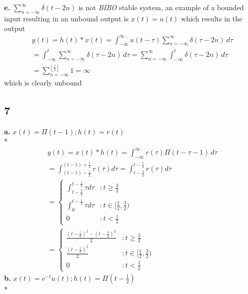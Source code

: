 \documentclass[10pt, letterpaper]{article}
\begin{document}
\textbf{e.} $\sum_{n = -\infty}^{\infty}\delta(t - 2n)$ is not \emph{BIBO} stable system, an example of a bounded input 
resulting in an unbound output is $x(t)= u(t)$ which results in the output
\begin{align*}
	y(t) = h(t) * x(t) = 
	\int_{-\infty}^{\infty} u(t - \tau)\sum_{n = -\infty}^{\infty} \delta(\tau - 2n) \, d\tau \\
	= \int_{-\infty}^{t} \sum_{n = -\infty}^{\infty} \delta(\tau - 2n) \, d\tau = 
	\sum_{n = -\infty}^{\infty}  \int_{-\infty}^{t} \delta(\tau - 2n) \, d\tau \\
	= \sum_{n = -\infty}^{\left \lfloor{\frac{t}{2}}\right \rfloor } 1 
	= \boxed{\infty}
\end{align*}
which is clearly unbound
\subsection*{7}
\textbf{a.} 
$x(t) = \Pi ( t - 1); h(t) = r(t)$ \\*
\begin{align*}
	y(t) = x(t) * h(t) = \int_{-\infty}^{\infty} r(\tau) \Pi (t - \tau - 1) \, d\tau \\
	= \int_{(t - 1) - \frac{1}{2}}^{(t - 1) + \frac{1}{2}}r(\tau) d\tau
	= \int_{t - \frac{3}{2}}^{t - \frac{1}{2}}r(\tau) d\tau \\
           = \left\{
  		\begin{array}{lr}
		    \int_{t - \frac{3}{2}}^{t - \frac{1}{2}}\tau d\tau & : t\geq \frac{3}{2} \\
		    \int_{0}^{t - \frac{1}{2}}\tau d\tau & : t \in [\frac{1}{2}, \frac{3}{2})\\
	              0 & : t < \frac{1}{2}
		  \end{array}
	\right. \\
	=
	\boxed{
          	\left\{
  		\begin{array}{lr}
		    \frac{(t - \frac{1}{2})^2 - (t - \frac{3}{2})^2}{2} & : t \geq \frac{3}{2} \\
		    \frac{(t - \frac{1}{2})^2}{2} & : t \in [\frac{1}{2}, \frac{3}{2})\\
	              0 & : t < \frac{1}{2}
		  \end{array}
	\right.
	}
\end{align*}
\textbf{b.}
$x(t) = e^{-t}u(t); h(t) = \Pi (t - \frac{1}{2})$\\*
\end{document}
